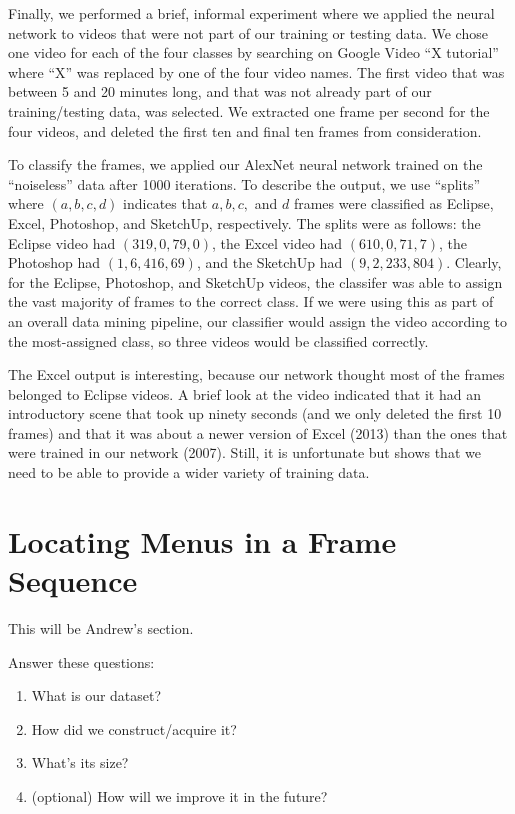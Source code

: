 \documentclass[10pt]{article}
\begin{document}
Finally, we performed a brief, informal experiment where we applied the neural network to videos that
were not part of our training or testing data. We chose one video for each of the four classes by
searching on Google Video ``X tutorial'' where ``X'' was replaced by one of the four video names.
The first video that was between 5 and 20 minutes long, and that was not already part of our
training/testing data, was selected. We extracted one frame per second for the four videos, and
deleted the first ten and final ten frames from consideration.

To classify the frames, we applied our AlexNet neural network trained on the ``noiseless'' data
after 1000 iterations. To describe the output, we use ``splits'' where $(a,b,c,d)$ indicates that
$a, b, c,$ and $d$ frames were classified as Eclipse, Excel, Photoshop, and SketchUp, respectively.
The splits were as follows: the Eclipse video had $(319,0,79,0)$, the Excel video had
$(610,0,71,7)$, the Photoshop had $(1,6,416,69)$, and the SketchUp had $(9,2,233,804)$. Clearly, for
the Eclipse, Photoshop, and SketchUp videos, the classifer was able to assign the vast majority of
frames to the correct class. If we were using this as part of an overall data mining pipeline, our
classifier would assign the video according to the most-assigned class, so three videos would be
classified correctly.

The Excel output is interesting, because our network thought most of the frames belonged to Eclipse
videos. A brief look at the video indicated that it had an introductory scene that took up ninety
seconds (and we only deleted the first 10 frames) and that it was about a newer version of Excel
(2013) than the ones that were trained in our network (2007). Still, it is unfortunate but shows
that we need to be able to provide a wider variety of training data.

\section{Locating Menus in a Frame Sequence}\label{andrew}

This will be Andrew's section.

Answer these questions:
\begin{enumerate}[noitemsep]
\item What is our dataset?
\item How did we construct/acquire it?
\item What's its size?
\item (optional) How will we improve it in the future?
\end{enumerate}
\end{document}
